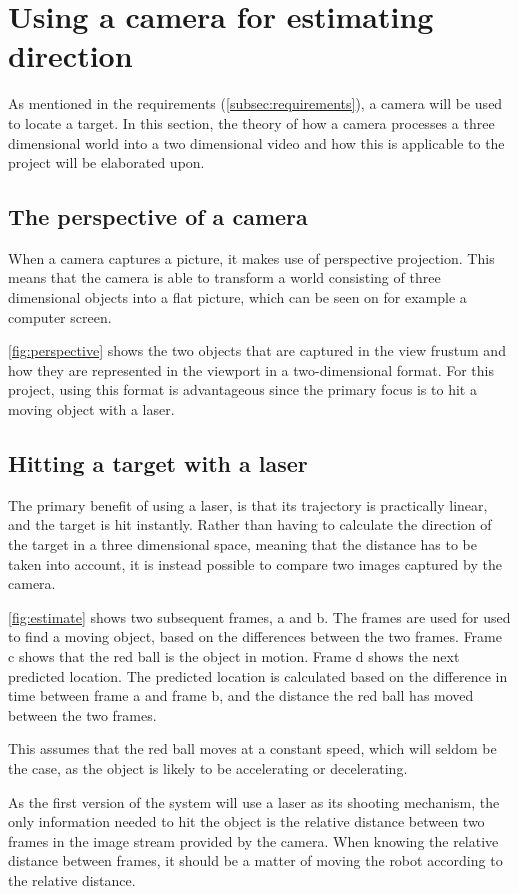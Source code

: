 \section{Using a camera for estimating direction}
As mentioned in the requirements (\autoref{subsec:requirements}), a camera will be used to locate a target.
In this section, the theory of how a camera processes a three dimensional world into a two dimensional video and how this is applicable to the project will be elaborated upon.

\subsection{The perspective of a camera}
When a camera captures a picture, it makes use of perspective projection.
This means that the camera is able to transform a world consisting of three dimensional objects into a flat picture, which can be seen on for example a computer screen.


\autoref{fig:perspective} shows the two objects that are captured in the view frustum and how they are represented in the viewport in a two-dimensional format.
For this project, using this format is advantageous since the primary focus is to hit a moving object with a laser.

\subsection{Hitting a target with a laser}
The primary benefit of using a laser, is that its trajectory is practically linear, and the target is hit instantly.
Rather than having to calculate the direction of the target in a three dimensional space, meaning that the distance has to be taken into account, it is instead possible to compare two images captured by the camera.

\autoref{fig:estimate} shows two subsequent frames, a and b.
The frames are used for used to find a moving object, based on the differences between the two frames.
Frame c shows that the red ball is the object in motion.
Frame d shows the next predicted location.
The predicted location is calculated based on the difference in time between frame a and frame b, and the distance the red ball has moved between the two frames.

This assumes that the red ball moves at a constant speed, which will seldom be the case, as the object is likely to be accelerating or decelerating.

As the first version of the system will use a laser as its shooting mechanism, the only information needed to hit the object is the relative distance between two frames in the image stream provided by the camera. 
When knowing the relative distance between frames, it should be a matter of moving the robot according to the relative distance.
